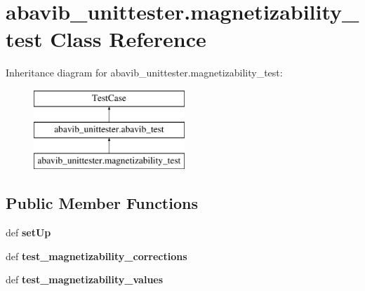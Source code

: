 \hypertarget{classabavib__unittester_1_1magnetizability__test}{\section{abavib\+\_\+unittester.\+magnetizability\+\_\+test Class Reference}
\label{classabavib__unittester_1_1magnetizability__test}
}
Inheritance diagram for abavib\+\_\+unittester.\+magnetizability\+\_\+test\+:\begin{figure}[H]
\begin{center}
\leavevmode
\includegraphics[height=3.000000cm]{classabavib__unittester_1_1magnetizability__test}
\end{center}
\end{figure}
\subsection*{Public Member Functions}
\begin{DoxyCompactItemize}
\item 
\hypertarget{classabavib__unittester_1_1magnetizability__test_ac27a40fddb70bda0fff7a000b72ba660}{def {\bfseries set\+Up}}\label{classabavib__unittester_1_1magnetizability__test_ac27a40fddb70bda0fff7a000b72ba660}

\item 
\hypertarget{classabavib__unittester_1_1magnetizability__test_a17f3538512a48c42cfb41d1ad5bc0a24}{def {\bfseries test\+\_\+magnetizability\+\_\+corrections}}\label{classabavib__unittester_1_1magnetizability__test_a17f3538512a48c42cfb41d1ad5bc0a24}

\item 
\hypertarget{classabavib__unittester_1_1magnetizability__test_a2bd0ab95861f7e8a15586626abd3183b}{def {\bfseries test\+\_\+magnetizability\+\_\+values}}\label{classabavib__unittester_1_1magnetizability__test_a2bd0ab95861f7e8a15586626abd3183b}

\end{DoxyCompactItemize}
